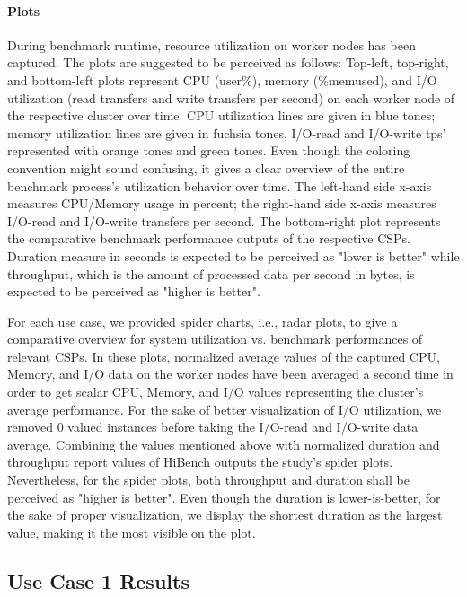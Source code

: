 \documentclass[review]{elsarticle}
\begin{document}
\paragraph{Plots}During benchmark runtime, resource utilization on worker nodes has been captured. The plots are suggested to be perceived as follows: Top-left, top-right, and bottom-left plots represent CPU (user\%), memory (\%memused), and I/O utilization (read transfers and write transfers per second) on each worker node of the respective cluster over time. CPU utilization lines are given in blue tones; memory utilization lines are given in fuchsia tones, I/O-read and I/O-write tps' represented with orange tones and green tones. Even though the coloring convention might sound confusing, it gives a clear overview of the entire benchmark process's utilization behavior over time. The left-hand side x-axis measures CPU/Memory usage in percent; the right-hand side x-axis measures I/O-read and I/O-write transfers per second. The bottom-right plot represents the comparative benchmark performance outputs of the respective CSPs. Duration measure in seconds is expected to be perceived as "lower is better" while throughput, which is the amount of processed data per second in bytes, is expected to be perceived as "higher is better".

For each use case, we provided spider charts, i.e., radar plots, to give a comparative overview for system utilization vs. benchmark performances of relevant CSPs. In these plots, normalized average values of the captured CPU, Memory, and I/O data on the worker nodes have been averaged a second time in order to get scalar CPU, Memory, and I/O values representing the cluster's average performance. For the sake of better visualization of I/O utilization, we removed 0 valued instances before taking the I/O-read and I/O-write data average. Combining the values mentioned above with normalized duration and throughput report values of HiBench outputs the study's spider plots. Nevertheless, for the spider plots, both throughput and duration shall be perceived as "higher is better". Even though the duration is lower-is-better, for the sake of proper visualization, we display the shortest duration as the largest value, making it the most visible on the plot. 


\subsection{Use Case 1 Results}
\end{document}
